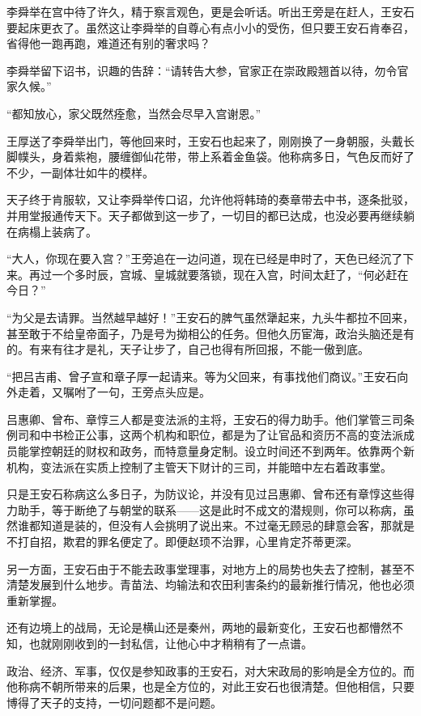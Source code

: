 李舜举在宫中待了许久，精于察言观色，更是会听话。听出王旁是在赶人，王安石要起床更衣了。虽然这让李舜举的自尊心有点小小的受伤，但只要王安石肯奉召，省得他一跑再跑，难道还有别的奢求吗？

李舜举留下诏书，识趣的告辞：“请转告大参，官家正在崇政殿翘首以待，勿令官家久候。”

“都知放心，家父既然痊愈，当然会尽早入宫谢恩。”

王厚送了李舜举出门，等他回来时，王安石也起来了，刚刚换了一身朝服，头戴长脚幞头，身着紫袍，腰缠御仙花带，带上系着金鱼袋。他称病多日，气色反而好了不少，一副体壮如牛的模样。

天子终于肯服软，又让李舜举传口诏，允许他将韩琦的奏章带去中书，逐条批驳，并用堂报通传天下。天子都做到这一步了，一切目的都已达成，也没必要再继续躺在病榻上装病了。

“大人，你现在要入宫？”王旁追在一边问道，现在已经是申时了，天色已经沉了下来。再过一个多时辰，宫城、皇城就要落锁，现在入宫，时间太赶了，“何必赶在今日？”

“为父是去请罪。当然越早越好！”王安石的脾气虽然犟起来，九头牛都拉不回来，甚至敢于不给皇帝面子，乃是号为拗相公的任务。但他久历宦海，政治头脑还是有的。有来有往才是礼，天子让步了，自己也得有所回报，不能一傲到底。

“把吕吉甫、曾子宣和章子厚一起请来。等为父回来，有事找他们商议。”王安石向外走着，又嘱咐了一句，王旁点头应是。

吕惠卿、曾布、章惇三人都是变法派的主将，王安石的得力助手。他们掌管三司条例司和中书检正公事，这两个机构和职位，都是为了让官品和资历不高的变法派成员能掌控朝廷的财权和政务，而特意量身定制。设立时间还不到两年。依靠两个新机构，变法派在实质上控制了主管天下财计的三司，并能暗中左右着政事堂。

只是王安石称病这么多日子，为防议论，并没有见过吕惠卿、曾布还有章惇这些得力助手，等于断绝了与朝堂的联系——这是此时不成文的潜规则，你可以称病，虽然谁都知道是装的，但没有人会挑明了说出来。不过毫无顾忌的肆意会客，那就是不打自招，欺君的罪名便定了。即便赵顼不治罪，心里肯定芥蒂更深。

另一方面，王安石由于不能去政事堂理事，对地方上的局势也失去了控制，甚至不清楚发展到什么地步。青苗法、均输法和农田利害条约的最新推行情况，他也必须重新掌握。

还有边境上的战局，无论是横山还是秦州，两地的最新变化，王安石也都懵然不知，也就刚刚收到的一封私信，让他心中才稍稍有了一点谱。

政治、经济、军事，仅仅是参知政事的王安石，对大宋政局的影响是全方位的。而他称病不朝所带来的后果，也是全方位的，对此王安石也很清楚。但他相信，只要博得了天子的支持，一切问题都不是问题。

